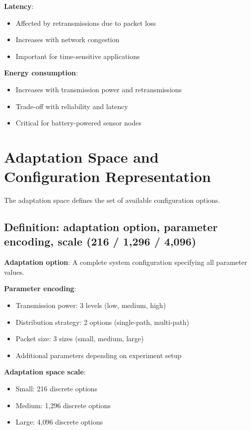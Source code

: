 \documentclass[11pt,a4paper]{article}
\begin{document}
\textbf{Latency}:
\begin{itemize}
    \item Affected by retransmissions due to packet loss
    \item Increases with network congestion
    \item Important for time-sensitive applications
\end{itemize}

\textbf{Energy consumption}:
\begin{itemize}
    \item Increases with transmission power and retransmissions
    \item Trade-off with reliability and latency
    \item Critical for battery-powered sensor nodes
\end{itemize}

\section{Adaptation Space and Configuration Representation}

The adaptation space defines the set of available configuration options.

\subsection{Definition: adaptation option, parameter encoding, scale (216 / 1,296 / 4,096)}

\textbf{Adaptation option}: A complete system configuration specifying all parameter values.

\textbf{Parameter encoding}:
\begin{itemize}
    \item Transmission power: 3 levels (low, medium, high)
    \item Distribution strategy: 2 options (single-path, multi-path)
    \item Packet size: 3 sizes (small, medium, large)
    \item Additional parameters depending on experiment setup
\end{itemize}

\textbf{Adaptation space scale}:
\begin{itemize}
    \item Small: 216 discrete options
    \item Medium: 1,296 discrete options
    \item Large: 4,096 discrete options
\end{itemize}
\end{document}
